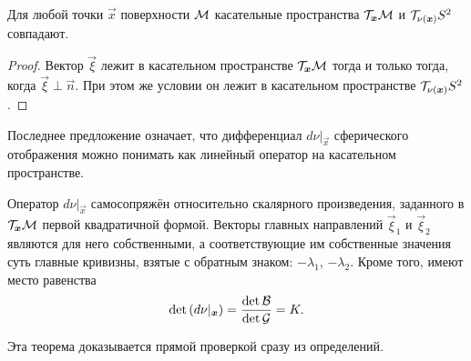 \begin{proposition}
	Для любой точки $\vec{x}$ поверхности $\mathcal{M}$ касательные пространства $\mathcal{T}_{\boldsymbol{x}}\mathcal{M}$ и $\mathcal{T}_{\nu(\boldsymbol{x})}S^2$ совпадают.
\end{proposition}

\begin{proof}
	Вектор $\vec{\xi}$ лежит в касательном пространстве $\mathcal{T}_{\boldsymbol{x}}\mathcal{M}$ тогда и только тогда, когда $\vec{\xi} \perp \vec{n}$. При этом же условии он лежит в касательном пространстве $\mathcal{T}_{\nu(\boldsymbol{x})}S^2$.
\end{proof}

Последнее предложение означает, что дифференциал $d\nu|_{\vec{x}}$ сферического отображения можно понимать как линейный оператор на касательном пространстве.

\begin{theorem}
	Оператор $d\nu|_{\vec{x}}$ самосопряжён относительно скалярного произведения, заданного в $\mathcal{T}_{\boldsymbol{x}}\mathcal{M}$ первой квадратичной формой. Векторы главных направлений $\vec{\xi}_1$ и $\vec{\xi}_2$ являются для него собственными, а соответствующие им собственные значения суть главные кривизны, взятые с обратным знаком: $-\lambda_1$, $-\lambda_2$. Кроме того, имеют место равенства
	\[
		\det\left(d\nu|_{\boldsymbol{x}}\right) = \frac{\det\mathcal{B}}{\det\mathcal{G}} = K.
	\]
\end{theorem}

\noindent
Эта теорема доказывается прямой проверкой сразу из определений.

